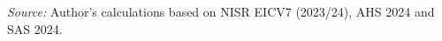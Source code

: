 \begin{table}[htbp]
\begin{minipage}{\linewidth}
\textit{Source:} Author's calculations based on NISR EICV7 (2023/24), AHS 2024 and SAS 2024.
\end{minipage}
\end{table}
